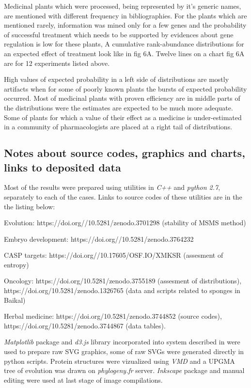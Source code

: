 \documentclass[12pt,aps]{revtex4}
\begin{document}
Medicinal plants which were processed, being represented by it's generic names, are mentioned with different frequency in bibliographies. For the plants which are mentioned rarely, information was mined only for a few genes and the probability of successful treatment which needs to be supported by evidences about gene regulation is low for these plants, A cumulative rank-abundance distributions for an expected effect of treatment look like in fig 6A. Twelve lines on a chart fig 6A are for 12 experiments listed above.  

High values of expected probability in a left side of distributions are mostly artifacts when for some of poorly known plants the bursts of expected probability occurred. Most of medicinal plants with proven efficiency are in middle parts of the distributions were the estimates are expected to be much more adequate. Some of plants for which a value of their effect as a medicine is under-estimated in a community of pharmacologists are placed at a right tail of distributions. 

\subsection{Notes about source codes, graphics and charts, links to deposited data}

Most of the results were prepared using utilities in \textit{C++ }and \textit{python 2.7}, separately to each of the cases. Links to source codes of these utilities are in the the listing below:

Evolution: https://doi.org//10.5281/zenodo.3701298 (stability of MSMS method)

Embryo development: https://doi.org//10.5281/zenodo.3764232  

CASP targets: https://doi.org//10.17605/OSF.IO/XMKSR (assesment of entropy)

Oncology: https://doi.org/10.5281/zenodo.3755189 (assesment of distributions), https://doi.org/10.5281/zenodo.1326765 (data and scripts related to sponges in Baikal) 

Herbal medicine: https://doi.org/10.5281/zenodo.3744852 (source codes), https://doi.org/10.5281/zenodo.3744867 (data tables).

\textit{Matplotlib} package and \textit{d3.js} library incorporated into system described in \cite{CS2} were used to prepare raw SVG graphics, some of raw SVGs were generated directly in python scripts. Protein structures were vizualized using \textit{VMD} and a UPGMA tree of evolution was drawn on \textit{phylogeny.fr} server. \textit{Inkscape} package and manual editing were used at last stage of image compilations.
\end{document}
